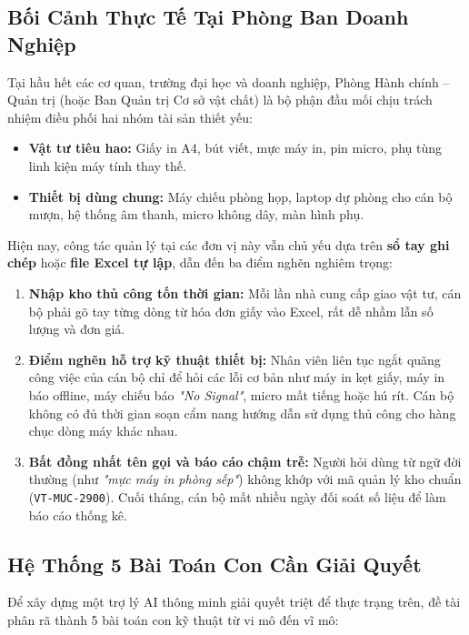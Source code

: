 \documentclass[11pt,a4paper]{article}
\begin{document}
\subsection{Bối Cảnh Thực Tế Tại Phòng Ban Doanh Nghiệp}
Tại hầu hết các cơ quan, trường đại học và doanh nghiệp, Phòng Hành chính -- Quản trị (hoặc Ban Quản trị Cơ sở vật chất) là bộ phận đầu mối chịu trách nhiệm điều phối hai nhóm tài sản thiết yếu:
\begin{itemize}[leftmargin=1.5em]
    \item \textbf{Vật tư tiêu hao:} Giấy in A4, bút viết, mực máy in, pin micro, phụ tùng linh kiện máy tính thay thế.
    \item \textbf{Thiết bị dùng chung:} Máy chiếu phòng họp, laptop dự phòng cho cán bộ mượn, hệ thống âm thanh, micro không dây, màn hình phụ.
\end{itemize}

Hiện nay, công tác quản lý tại các đơn vị này vẫn chủ yếu dựa trên \textbf{sổ tay ghi chép} hoặc \textbf{file Excel tự lập}, dẫn đến ba điểm nghẽn nghiêm trọng:
\begin{enumerate}[leftmargin=1.8em]
    \item \textbf{Nhập kho thủ công tốn thời gian:} Mỗi lần nhà cung cấp giao vật tư, cán bộ phải gõ tay từng dòng từ hóa đơn giấy vào Excel, rất dễ nhầm lẫn số lượng và đơn giá.
    \item \textbf{Điểm nghẽn hỗ trợ kỹ thuật thiết bị:} Nhân viên liên tục ngắt quãng công việc của cán bộ chỉ để hỏi các lỗi cơ bản như máy in kẹt giấy, máy in báo offline, máy chiếu báo \textit{"No Signal"}, micro mất tiếng hoặc hú rít. Cán bộ không có đủ thời gian soạn cẩm nang hướng dẫn sử dụng thủ công cho hàng chục dòng máy khác nhau.
    \item \textbf{Bất đồng nhất tên gọi và báo cáo chậm trễ:} Người hỏi dùng từ ngữ đời thường (như \textit{"mực máy in phòng sếp"}) không khớp với mã quản lý kho chuẩn (\texttt{VT-MUC-2900}). Cuối tháng, cán bộ mất nhiều ngày đối soát số liệu để làm báo cáo thống kê.
\end{enumerate}

\subsection{Hệ Thống 5 Bài Toán Con Cần Giải Quyết}
Để xây dựng một trợ lý AI thông minh giải quyết triệt để thực trạng trên, đề tài phân rã thành 5 bài toán con kỹ thuật từ vi mô đến vĩ mô:
\end{document}

